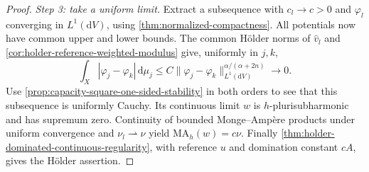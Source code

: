 \begin{proof}
\emph{Step 3: take a uniform limit.} Extract a subsequence with $c_l\to c>0$ and $\varphi_l$ converging in $L^1(\mathrm dV)$, using \cref{thm:normalized-compactness}. All potentials now have common upper and lower bounds. The common H\"older norms of $\widehat v_l$ and \cref{cor:holder-reference-weighted-modulus} give, uniformly in $j,k$,
\[
 \int_X|\varphi_j-\varphi_k|\,\mathrm d\mu_j
 \leq C\|\varphi_j-\varphi_k\|_{L^1(\mathrm dV)}^{\alpha/(\alpha+2n)}
 \longrightarrow0.
\]
Use \cref{prop:capacity-square-one-sided-stability} in both orders to see that this subsequence is uniformly Cauchy. Its continuous limit $w$ is $h$-plurisubharmonic and has supremum zero. Continuity of bounded Monge--Amp\`ere products under uniform convergence and $\nu_l\rightharpoonup\nu$ yield $\mathrm{MA}_h(w)=c\nu$. Finally \cref{thm:holder-dominated-continuous-regularity}, with reference $u$ and domination constant $cA$, gives the H\"older assertion.
\end{proof}
